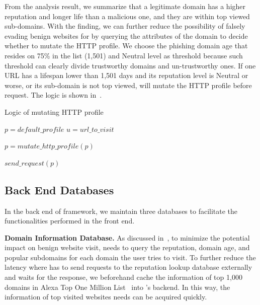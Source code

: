 From the analysis result, we summarize that a legitimate domain has a higher reputation and longer life than a malicious one, and they are within top viewed sub-domains.
With the finding, we can further reduce the possibility of falsely evading benign websites for \spartacus by querying the attributes of the domain to decide whether to mutate the HTTP profile.
We choose the phishing domain age that resides on 75\% in the list (1,501) and Neutral level as threshold because such threshold can clearly divide trustworthy domains and un-trustworthy ones.
If one URL has a lifespan lower than 1,501 days and its reputation level is Neutral or worse, or its sub-domain is not top viewed, \spartacus will mutate the HTTP profile before request.
The logic is shown in~.

\begin{algorithm}
  \caption{Logic of mutating HTTP profile}
\begin{algorithmic}[1]

\State $p = default\_profile$
\State $u = url\_to\_visit$

    \State $p = mutate\_http\_profile(p)$
\EndIf

\State $send\_request(p)$

\end{algorithmic}
\label{alg:mutatelogic}
\end{algorithm}



\subsection{Back End Databases}

In the back end of \spartacus framework, we maintain three databases to facilitate the functionalities performed in the front end.

\noindent
\textbf{Domain Information Database.}
As discussed in~, to minimize the potential impact on benign website visit,
\spartacus needs to query the reputation, domain age, and popular subdomains for each domain the user tries to visit.
To further reduce the latency where \spartacus has to send requests to the reputation lookup database externally and waits for the response,
we beforehand cache the information of top 1,000 domains in Alexa Top One Million List~\cite{AlexaTop1M} into \spartacus's backend.
In this way, the information of top visited websites \spartacus needs can be acquired quickly.


